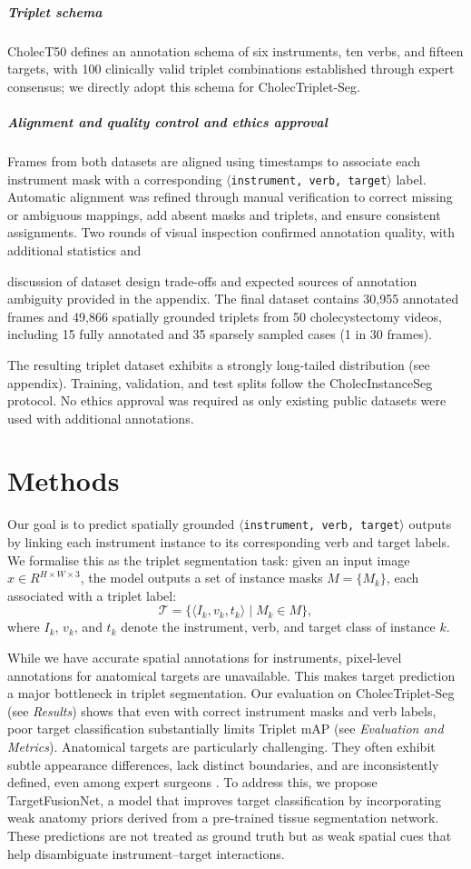 \documentclass[pdflatex,sn-mathphys-num]{sn-jnl}%
\newcommand{\ivttriplet}{\texttt{$\langle$instrument, verb, target$\rangle$}\xspace}
\newcommand{\anatprior}{weak anatomy\xspace}
\newcommand{\mAP}{\textrm{mAP}}
\newcommand{\mysubsection}[1]{\subparagraph{#1}}
\newcommand{\revref}[2]{%
  \marginpar{\raggedright$\scriptstyle R_{#1}C_{#2}$}%
}
\DeclareRobustCommand{\robustrevref}[2]{%
\revref{#1}{#2}
}
\newcommand{\revnew}[1]{%
{\color{orange}#1}\xspace
}
\newcommand{\revref}[2]{\ignorespaces}
\newcommand{\robustrevref}[2]{\ignorespaces}
\newcommand{\revnew}[1]{#1\xspace}
\theoremstyle{thmstyleone}%
\theoremstyle{thmstyletwo}%
\theoremstyle{thmstylethree}%
\begin{document}
\mysubsection{Triplet schema}
CholecT50 defines an annotation schema of six instruments, ten verbs, and fifteen targets, with 100 clinically valid triplet combinations established through expert consensus; we directly adopt this schema for CholecTriplet-Seg.


\mysubsection{Alignment and quality control and ethics approval}
Frames from both datasets are aligned using timestamps to associate each instrument mask with a corresponding \ivttriplet label. 
Automatic alignment was refined through manual verification to correct missing or ambiguous mappings, add absent masks and triplets, and ensure consistent assignments. 
Two rounds of visual inspection confirmed annotation quality, with additional statistics and \robustrevref{6}{1}\revnew{discussion of dataset design trade-offs and expected sources of annotation ambiguity}  provided in the appendix. 
The final dataset contains 30{,}955 annotated frames and 49{,}866 spatially grounded triplets from 50 cholecystectomy videos, including 15 fully annotated and 35 sparsely sampled cases (1 in 30 frames).
\robustrevref{4}{2}\revnew{
The resulting triplet dataset exhibits a strongly long-tailed distribution (see appendix).
} Training, validation, and test splits follow the CholecInstanceSeg protocol. 
No ethics approval was required as only existing public datasets were used with additional annotations. 


\section{Methods}
Our goal is to predict spatially grounded \ivttriplet outputs by linking each instrument instance to its corresponding verb and target labels. We formalise this as the triplet segmentation task: given an input image $x \in R^{H \times W \times 3}$, the model outputs a set of instance masks $M = \{ M_k \}$, each associated with a triplet label:
\[
    \mathcal{T} = \{ \langle I_k, v_k, t_k \rangle \mid M_k \in M \},
\]
where $I_k$, $v_k$, and $t_k$ denote the instrument, verb, and target class of instance $k$.

While we have accurate spatial annotations for instruments, pixel-level annotations for anatomical targets are unavailable. This makes target prediction a major bottleneck in triplet segmentation. Our evaluation on CholecTriplet-Seg (see \emph{Results}) shows that even with correct instrument masks and verb labels, poor target classification substantially limits Triplet $\mAP$ (see \emph{Evaluation and Metrics}). Anatomical targets are particularly challenging.
They often exhibit subtle appearance differences, lack distinct boundaries, and are inconsistently defined, even among expert surgeons \cite{owen2022automated}.
%
To address this, we propose TargetFusionNet, a model that improves target classification by incorporating \anatprior priors derived from a pre-trained tissue segmentation network. These predictions are not treated as ground truth but as weak spatial cues that help disambiguate instrument–target interactions.
\end{document}
